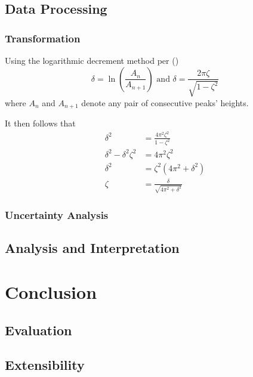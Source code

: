 \documentclass[a4paper,12pt]{article}
\newcommand{\paren}[1]{\left(#1\right)}
\begin{document}
\subsection{Data Processing}

\subsubsection{Transformation}

Using the logarithmic decrement method per  (\citeyear{inman_2008_engineering})
$$\delta = \ln\paren{\frac{A_n}{A_{n+1}}} \text{ and } \delta = \frac{2\pi \zeta}{\sqrt{1 - \zeta^2}}$$ where $A_n$ and $A_{n + 1}$ denote any pair of consecutive peaks' heights.

\noindent It then follows that
\begin{align*}
  \delta^2                   & = \frac{4\pi^2 \zeta^2}{1 - \zeta^2}      \\
  \delta^2 - \delta^2\zeta^2 & = 4\pi^2\zeta^2                           \\
  \delta^2                   & = \zeta^2\paren{4\pi^2 + \delta^2}        \\
  \zeta                      & = \frac{\delta}{\sqrt{4\pi^2 + \delta^2}}
\end{align*}

\subsubsection{Uncertainty Analysis}

\subsection{Analysis and Interpretation}

\section{Conclusion}

\subsection{Evaluation}

\subsection{Extensibility}

\pagebreak

\printbibliography
\end{document}
